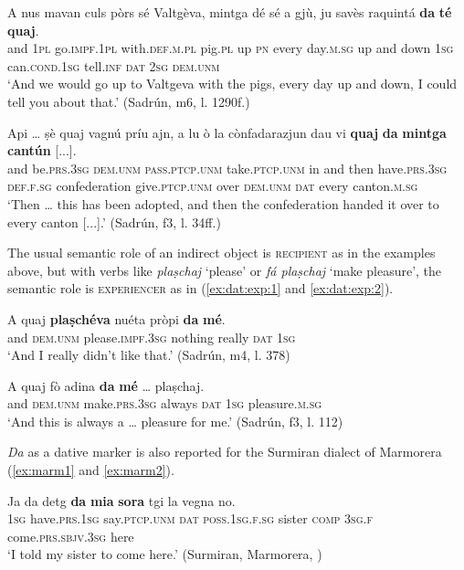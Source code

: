 \ea
\label{ex:io:3}
\gll    A nus mavan culs pòrs sé Valtgèva, mintga dé sé a gjù, ju savès raquintá {\ob}\textbf{da} \textbf{té}{\cb} {\ob}\textbf{quaj}{\cb}.\\
and \textsc{1pl}  go.\textsc{impf.1pl} with.\textsc{def.m.pl} pig.\textsc{pl} up \textsc{pn} every day.\textsc{m.sg} up and down  \textsc{1sg}  can.\textsc{cond.1sg}  tell.\textsc{inf}  \textsc{dat}  \textsc{2sg} \textsc{dem.unm}\\
\glt `And we would go up to Valtgeva with the pigs, every day up and down, I could tell you about that.' (Sadrún, m6, l. 1290f.)
\z

\ea\label{ex:io:1}
\gll Api … ṣè quaj vagnú príu ajn, a lu ò la cònfadarazjun dau vi {\ob}\textbf{quaj}{\cb} {\ob}\textbf{da} \textbf{mintga} \textbf{cantún}{\cb} [...].   \\
and {} be.\textsc{prs.3sg} \textsc{dem.unm} \textsc{pass.ptcp.unm} take.\textsc{ptcp.unm} in and then have.\textsc{prs.3sg} \textsc{def.f.sg} confederation give.\textsc{ptcp.unm} over \textsc{dem.unm} \textsc{dat} every canton.\textsc{m.sg}\\
\glt `Then … this has been adopted, and then the confederation handed it over to every canton [...].' (Sadrún, f3, l. 34ff.)
\z

The usual semantic role of an indirect object is \textsc{recipient} as in the examples above, but with verbs like \textit{plaṣchaj} `please' or \textit{fá plaṣchaj} `make pleasure', the semantic role is  \textsc{experiencer} as in (\ref{ex:dat:exp:1} and \ref{ex:dat:exp:2}).

\ea\label{ex:dat:exp:1}
\gll A quaj \textbf{plaṣchéva} nuéta pròpi \textbf{da} \textbf{mé}. \\
and \textsc{dem.unm} please.\textsc{impf.3sg} nothing really \textsc{dat} \textsc{1sg}   \\
\glt `And I really didn’t like that.' (Sadrún, m4, l. 378)
\z

\ea
\label{ex:dat:exp:2}
\gll  A quaj fò adina \textbf{da} \textbf{mé} … plaṣchaj.  \\
and \textsc{dem.unm} make.\textsc{prs.3sg} always \textsc{dat} \textsc{1sg} {} pleasure.\textsc{m.sg} \\
\glt `And this is always a … pleasure for me.' (Sadrún, f3, l. 112)
\z

\textit{Da} as a dative marker is also reported for the Surmiran dialect of Marmorera (\ref{ex:marm1} and \ref{ex:marm2}).

\ea\label{ex:marm1}
\gll  Ja da detg \textbf{da} \textbf{mia} \textbf{sora} tgi la vegna no.\\
\textsc{1sg} have.\textsc{prs.1sg} say.\textsc{ptcp.unm} \textsc{dat} \textsc{poss.1sg.f.sg} sister \textsc{comp} \textsc{3sg.f} come.\textsc{prs.sbjv.3sg} here\\
\glt `I told my sister to come here.' (Surmiran, Marmorera, )
\z


